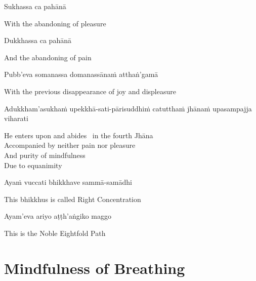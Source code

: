 Sukhassa ca pahānā

\begin{english}
  With the abandoning of pleasure
\end{english}

Dukkhassa ca pahānā

\begin{english}
  And the abandoning of pain
\end{english}

Pubb'eva somanassa domanassānaṁ atthaṅ'gamā

\begin{english}
  With the previous disappearance of joy and displeasure\ifdigitalversion\makeatletter\hyperlink{endnote67-appendix}\makeatother\fi
\end{english}

\begin{pali-hang}
  Adukkham'asukhaṁ upekkhā-sati-pārisuddhiṁ catutthaṁ jhānaṁ upasampajja viharati
\end{pali-hang}

\begin{english-verses}
  He enters upon and abides \breathmark\ in the fourth Jhāna\\
  Accompanied by neither pain nor pleasure\\
  And purity of mindfulness\\
  Due to equanimity
\end{english-verses}

Ayaṁ vuccati bhikkhave sammā-samādhi

\begin{english}
  This bhikkhus is called Right Concentration
\end{english}

Ayam'eva ariyo aṭṭh'aṅgiko maggo

\begin{english}
  This is the Noble Eightfold Path
\end{english}

\suttaRef{[SN 45.8]}

\ifdigitalversion{}\fi



\section{Mindfulness of Breathing}
\label{mindfulness-of-breathing}

